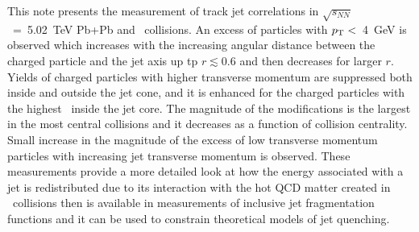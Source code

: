 
This note presents the measurement of track jet correlations in $\sqrt{s_{NN}}$~=~5.02~TeV 
   Pb+Pb and \pp\ collisions. 
An excess of particles with $p_{\mathrm{T}} <$~4~GeV is observed which increases with the increasing angular distance between the charged particle and the jet axis up tp $r\lesssim 0.6$ and then decreases for larger $r$.  Yields of charged particles with higher transverse momentum are suppressed both inside and outside the jet cone, and it is enhanced for the charged particles with the highest \pT\ inside the jet core.
The magnitude of the modifications is the largest in the most central collisions and it decreases
as a function of collision centrality. Small increase in the magnitude of the 
excess of low transverse momentum particles with increasing jet transverse momentum is observed.
These measurements provide a more detailed look at how the energy associated with a jet
is redistributed due to its interaction with the hot QCD matter created in \pbpb\ collisions
then is available in measurements of inclusive jet fragmentation functions and it can be used to constrain theoretical models of jet quenching.


